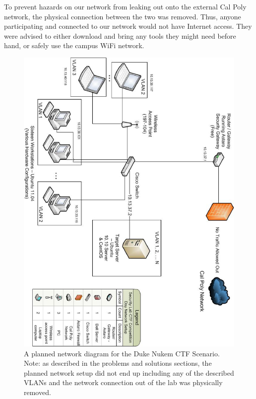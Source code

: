 \documentclass[10pt]{article}
\begin{document}
To prevent hazards on our network from leaking out onto the external Cal Poly
network, the physical connection between the two was removed. Thus, anyone
participating and connected to our network would not have Internet access. They
were advised to either download and bring any tools they might need before hand,
or safely use the campus WiFi network.

\begin{figure}[here]
\includegraphics[scale=.50]{resources/dukenukem_network_diagram.eps}
\caption{A planned network diagram for the Duke Nukem CTF Scenario. Note: as
described in the problems and solutions sections, the planned network setup
did not end up including any of the described VLANs and the network connection
out of the lab was physically removed.}
\label{fig:dukeNetworkDiagram}
\end{figure}
\end{document}
